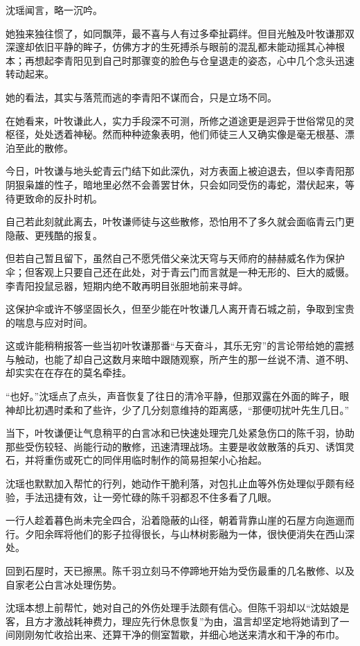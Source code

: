 沈瑶闻言，略一沉吟。

她独来独往惯了，如同飘萍，最不喜与人有过多牵扯羁绊。但目光触及叶牧谦那双深邃却依旧平静的眸子，仿佛方才的生死搏杀与眼前的混乱都未能动摇其心神根本；再想起李青阳见到自己时那骤变的脸色与仓皇退走的姿态，心中几个念头迅速转动起来。

她的看法，其实与落荒而逃的李青阳不谋而合，只是立场不同。

在她看来，叶牧谦此人，实力手段深不可测，所修之道途更是迥异于世俗常见的灵枢径，处处透着神秘。然而种种迹象表明，他们师徒三人又确实像是毫无根基、漂泊至此的散修。

今日，叶牧谦与地头蛇青云门结下如此深仇，对方表面上被迫退去，但以李青阳那阴狠枭雄的性子，暗地里必然不会善罢甘休，只会如同受伤的毒蛇，潜伏起来，等待更致命的反扑时机。

自己若此刻就此离去，叶牧谦师徒与这些散修，恐怕用不了多久就会面临青云门更隐蔽、更残酷的报复。

但若自己暂且留下，虽然自己不愿凭借父亲沈天穹与天师府的赫赫威名作为保护伞；但客观上只要自己还在此处，对于青云门而言就是一种无形的、巨大的威慑。李青阳投鼠忌器，短期内绝不敢再明目张胆地前来寻衅。

这保护伞或许不够坚固长久，但至少能在叶牧谦几人离开青石城之前，争取到宝贵的喘息与应对时间。

这或许能稍稍报答一些当初叶牧谦那番“与天奋斗，其乐无穷”的言论带给她的震撼与触动，也能了却自己这数月来暗中跟随观察，所产生的那一丝说不清、道不明、却实实在在存在的莫名牵挂。

“也好。”沈瑶点了点头，声音恢复了往日的清冷平静，但那双露在外面的眸子，眼神却比初遇时柔和了些许，少了几分刻意维持的距离感，“那便叨扰叶先生几日。”

当下，叶牧谦便让气息稍平的白言冰和已快速处理完几处紧急伤口的陈千羽，协助那些受伤较轻、尚能行动的散修，迅速清理战场。主要是收敛散落的兵刃、诱饵灵石，并将重伤或死亡的同伴用临时制作的简易担架小心抬起。

沈瑶也默默加入帮忙的行列，她动作干脆利落，对包扎止血等外伤处理似乎颇有经验，手法迅捷有效，让一旁忙碌的陈千羽都忍不住多看了几眼。

一行人趁着暮色尚未完全四合，沿着隐蔽的山径，朝着背靠山崖的石屋方向迤逦而行。夕阳余晖将他们的影子拉得很长，与山林树影融为一体，很快便消失在西山深处。

回到石屋时，天已擦黑。陈千羽立刻马不停蹄地开始为受伤最重的几名散修、以及自家老公白言冰处理伤势。

沈瑶本想上前帮忙，她对自己的外伤处理手法颇有信心。但陈千羽却以“沈姑娘是客，且方才激战耗神费力，理应先行休息恢复”为由，温言却坚定地将她请到了一间刚刚匆忙收拾出来、还算干净的侧室暂歇，并细心地送来清水和干净的布巾。

